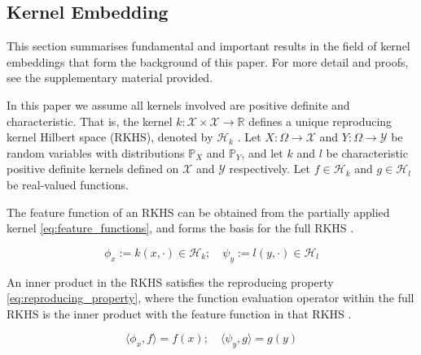 \documentclass[twoside]{article} \usepackage{aistats2017}
\theoremstyle{definition}
\theoremstyle{theorem}
\newcommand{\rv}[1]{{#1}}
\newcommand{\extra}[1]{{\color{ForestGreen} #1}}
\newcommand{\inner}[2]{{\langle #1, #2 \rangle}}
\newcommand{\Hk}{\mathcal{H}_{k}}
\newcommand{\Hl}{\mathcal{H}_{l}}
\begin{document}
	\subsection{Kernel Embedding}
	\label{sec:background:kernel_embedding}
	
		This section summarises fundamental and important results in the field of kernel embeddings that form the background of this paper. For more detail and proofs, see the supplementary material provided.

		In this paper we assume all kernels involved are positive definite and characteristic. That is, the kernel $k : \mathcal{X} \times \mathcal{X} \to \mathbb{R}$ defines a unique reproducing kernel Hilbert space (RKHS), denoted by $\mathcal{H}_{k}$ \citep{fukumizu2004dimensionality}. Let $\rv{X} : \Omega \to \mathcal{X}$ and $\rv{Y} : \Omega \to \mathcal{Y}$ be random variables with distributions $\mathbb{P}_{\rv{X}}$ and $\mathbb{P}_{\rv{Y}}$, and let $k$ and $l$ be characteristic positive definite kernels defined on $\mathcal{X}$ and $\mathcal{Y}$ respectively. Let $f \in \Hk$ and $g \in \Hl$ be real-valued functions.
		
		The feature function of an RKHS can be obtained from the partially applied kernel \eqref{eq:feature_functions}, and forms the basis for the full RKHS \citep{muandet2016kernel}.
			
		\begin{equation}
			\phi_{x} := k(x, \cdot) \in \Hk ;\quad \psi_{y} := l(y, \cdot) \in \Hl
		\label{eq:feature_functions}
		\end{equation}

		An inner product in the RKHS satisfies the reproducing property \eqref{eq:reproducing_property}, where the function evaluation operator within the full RKHS is the inner product with the feature function in that RKHS \citep{muandet2016kernel}.

		\begin{equation}
			\inner{\phi_{x}}{f} = f(x) ;\quad \inner{\psi_{y}}{g} = g(y)
		\label{eq:reproducing_property}
		\end{equation}
		
%
		
\end{document}

